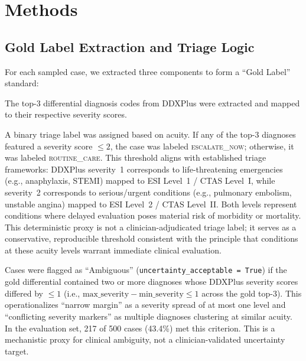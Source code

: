\documentclass[11pt,a4paper]{article}
\begin{document}
\section{Methods}

\subsection{Gold Label Extraction and Triage Logic}

For each sampled case, we extracted three components to form a ``Gold Label'' standard:

\begin{description}[style=unboxed, leftmargin=0pt]
  \item[Differential Mapping.] The top-3 differential diagnosis codes from DDXPlus were extracted and mapped to their respective severity scores.

  \item[Deterministic Triage.] A binary triage label was assigned based on acuity. If any of the top-3 diagnoses featured a severity score $\leq 2$, the case was labeled \textsc{escalate\_now}; otherwise, it was labeled \textsc{routine\_care}. This threshold aligns with established triage frameworks: DDXPlus severity~1 corresponds to life-threatening emergencies (e.g., anaphylaxis, STEMI) mapped to ESI Level~1 / CTAS Level~I, while severity~2 corresponds to serious/urgent conditions (e.g., pulmonary embolism, unstable angina) mapped to ESI Level~2 / CTAS Level~II. Both levels represent conditions where delayed evaluation poses material risk of morbidity or mortality. This deterministic proxy is not a clinician-adjudicated triage label; it serves as a conservative, reproducible threshold consistent with the principle that conditions at these acuity levels warrant immediate clinical evaluation.

  \item[Ambiguity Flagging.] Cases were flagged as ``Ambiguous'' (\texttt{uncertainty\_acceptable\,=\,True}) if the gold differential contained two or more diagnoses whose DDXPlus severity scores differed by $\leq 1$ (i.e., $\text{max\_severity} - \text{min\_severity} \leq 1$ across the gold top-3). This operationalizes ``narrow margin'' as a severity spread of at most one level and ``conflicting severity markers'' as multiple diagnoses clustering at similar acuity. In the evaluation set, 217 of 500 cases (43.4\%) met this criterion. This is a mechanistic proxy for clinical ambiguity, not a clinician-validated uncertainty target.
\end{description}
\end{document}
